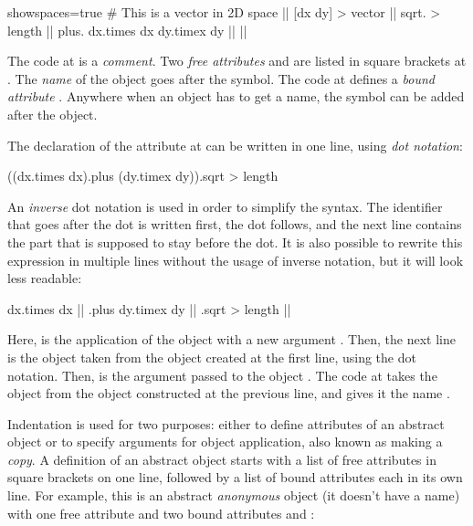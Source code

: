 \begin{ffcode*}{showspaces=true}
# This is a vector in 2D space |$\label{ln:comment}$|
[dx dy] > vector |$\label{ln:vector}$|
  sqrt. > length |$\label{ln:length}$|
    plus.
      dx.times dx
      dy.timex dy |$\label{ln:length-end}$| |$\label{ln:vector-end}$|
\end{ffcode*}

The code at  is a \emph{comment}.
Two \emph{free attributes}  and 
are listed in square brackets at .
The \emph{name} of the object goes after the \ff{>} symbol.
The code at  defines
a \emph{bound attribute} . Anywhere when an object
has to get a name, the \ff{>} symbol can be added after the object.

The declaration of the attribute  at 
can be written in one line, using \emph{dot notation}:

\begin{ffcode}
((dx.times dx).plus (dy.timex dy)).sqrt > length
\end{ffcode}

An \emph{inverse} dot notation is used in order to simplify
the syntax. The identifier that goes after the dot is written
first, the dot follows, and the next line contains the part
that is supposed to stay before the dot. It is also possible to rewrite
this expression in multiple lines without the usage of
inverse notation, but it will look less readable:

\begin{ffcode}
dx.times dx |$\label{ln:dx-pow}$|
.plus
  dy.timex dy |$\label{ln:dx-pow-2}$|
.sqrt > length |$\label{ln:dx-pow-3}$|
\end{ffcode}

Here,  is the application of the object  with
a new argument . Then, the next line is the object  taken
from the object created at the first line, using the dot notation. Then,
 is the argument passed to the object .
The code at  takes the object  from the object constructed
at the previous line, and gives it the name .

Indentation is used for two purposes: either to define attributes
of an abstract object or to specify arguments for object application, also
known as making a \emph{copy}.
A definition of an abstract object starts with a list of free attributes
in square brackets on one line, followed by a list of bound attributes
each in its own line. For example, this is an abstract \emph{anonymous} object
(it doesn't have a name)
with one free attribute  and two bound attributes  and :

